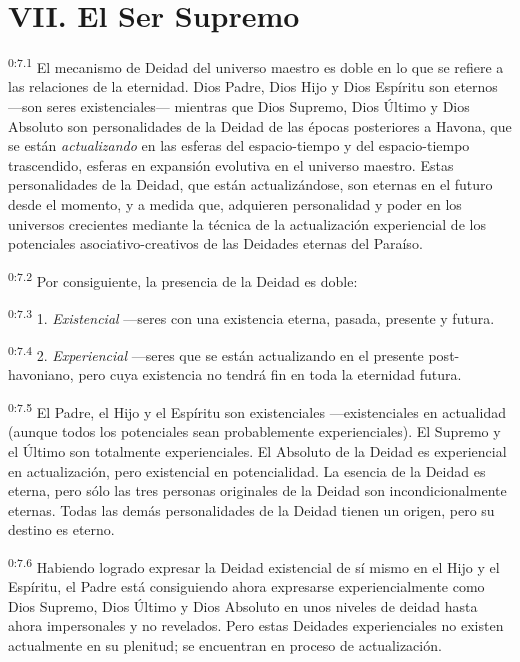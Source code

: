 \section*{VII. El Ser Supremo}
\par
\textsuperscript{0:7.1} El mecanismo de Deidad del universo maestro es doble en lo que se refiere a las relaciones de la eternidad. Dios Padre, Dios Hijo y Dios Espíritu son eternos ---son seres existenciales--- mientras que Dios Supremo, Dios Último y Dios Absoluto son personalidades de la Deidad de las épocas posteriores a Havona, que se están \textit{actualizando} en las esferas del espacio-tiempo y del espacio-tiempo trascendido, esferas en expansión evolutiva en el universo maestro. Estas personalidades de la Deidad, que están actualizándose, son eternas en el futuro desde el momento, y a medida que, adquieren personalidad y poder en los universos crecientes mediante la técnica de la actualización experiencial de los potenciales asociativo-creativos de las Deidades eternas del Paraíso.

\par
\textsuperscript{0:7.2} Por consiguiente, la presencia de la Deidad es doble:

\par
\textsuperscript{0:7.3} 1. \textit{Existencial} ---seres con una existencia eterna, pasada, presente y futura.

\par
\textsuperscript{0:7.4} 2. \textit{Experiencial} ---seres que se están actualizando en el presente post-havoniano, pero cuya existencia no tendrá fin en toda la eternidad futura.

\par
\textsuperscript{0:7.5} El Padre, el Hijo y el Espíritu son existenciales ---existenciales en actualidad (aunque todos los potenciales sean probablemente experienciales). El Supremo y el Último son totalmente experienciales. El Absoluto de la Deidad es experiencial en actualización, pero existencial en potencialidad. La esencia de la Deidad es eterna, pero sólo las tres personas originales de la Deidad son incondicionalmente eternas. Todas las demás personalidades de la Deidad tienen un origen, pero su destino es eterno.

\par
\textsuperscript{0:7.6} Habiendo logrado expresar la Deidad existencial de sí mismo en el Hijo y el Espíritu, el Padre está consiguiendo ahora expresarse experiencialmente como Dios Supremo, Dios Último y Dios Absoluto en unos niveles de deidad hasta ahora impersonales y no revelados. Pero estas Deidades experienciales no existen actualmente en su plenitud; se encuentran en proceso de actualización.

